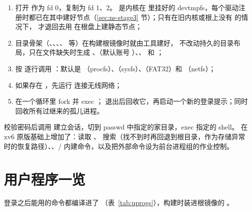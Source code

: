 \begin{enumerate}
  \item 打开  作为 fd 0，复制为 fd 1、2。 是内核在  里挂好的 devtmpfs，每个驱动注册时都已在其中建好节点（\ref{sec:ns-stage3} 节）；只有在旧内核或根上没有  的情况下， 才退回去用  在根盘上建静态节点；
  \item 目录骨架（、、、、 等）在构建根镜像时就由工具建好， 不改动持久的目录布局，只在文件缺失时生成 、（默认账号 ）、、 和 ；
  \item 按  逐行调用 ：默认是 （procfs）、（sysfs）、（FAT32）和 （netfs）；
  \item 如果存在 ，先运行  连接无线网络；
  \item 在一个循环里 fork 并 exec ； 退出后回收它，再启动一个新的登录提示；同时回收所有过继来的孤儿进程。
\end{enumerate}

 校验密码后调用  建立会话，切到 passwd 中指定的家目录，exec 指定的 shell。 在 xv6 原版基础上增加了：读取 、 搜索（找不到时再回退到根目录，作为存储异常时的恢复路径）、、/ 内建命令，以及把外部命令设为前台进程组的作业控制。

\section{用户程序一览}

登录之后能用的命令都编译进了 （表~\ref{tab:uprogs}），构建时装进根镜像的 。

